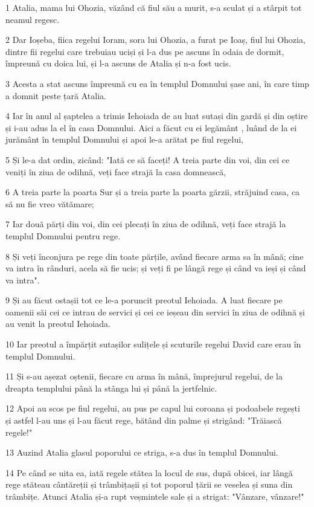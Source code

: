 \par 1 Atalia, mama lui Ohozia, văzând că fiul său a murit, s-a sculat și a stârpit tot neamul regesc.
\par 2 Dar Ioșeba, fiica regelui Ioram, sora lui Ohozia, a furat pe Ioaș, fiul lui Ohozia, dintre fii regelui care trebuiau uciși și l-a dus pe ascuns în odaia de dormit, împreună cu doica lui, și l-a ascuns de Atalia și n-a fost ucis.
\par 3 Acesta a stat ascuns împreună cu ea în templul Domnului șase ani, în care timp a domnit peste țară Atalia.
\par 4 Iar în anul al șaptelea a trimis Iehoiada de au luat sutași din gardă și din oștire și i-au adus la el în casa Domnului. Aici a făcut cu ei legământ , luând de la ei jurământ în templul Domnului și apoi le-a arătat pe fiul regelui,
\par 5 Și le-a dat ordin, zicând: "Iată ce să faceți! A treia parte din voi, din cei ce veniți în ziua de odihnă, veți face strajă la casa domnească,
\par 6 A treia parte la poarta Sur și a treia parte la poarta gărzii, străjuind casa, ca să nu fie vreo vătămare;
\par 7 Iar două părți din voi, din cei plecați în ziua de odihnă, veți face strajă la templul Domnului pentru rege.
\par 8 Și veți înconjura pe rege din toate părțile, având fiecare arma sa în mână; cine va intra în rânduri, acela să fie ucis; și veți fi pe lângă rege și când va ieși și când va intra".
\par 9 Și au făcut ostașii tot ce le-a poruncit preotul Iehoiada. A luat fiecare pe oamenii săi cei ce intrau de servici și cei ce ieșeau din servici în ziua de odihnă și au venit la preotul Iehoiada.
\par 10 Iar preotul a împărțit sutașilor sulițele și scuturile regelui David care erau în templul Domnului.
\par 11 Și s-au așezat oștenii, fiecare cu arma în mână, împrejurul regelui, de la dreapta templului până la stânga lui și până la jertfelnic.
\par 12 Apoi au scos pe fiul regelui, au pus pe capul lui coroana și podoabele regești  și astfel l-au uns și l-au făcut rege, bătând din palme și strigând: "Trăiască regele!"
\par 13 Auzind Atalia glasul poporului ce striga, s-a dus în templul Domnului.
\par 14 Pe când se uita ea, iată regele stătea la locul de sus, după obicei, iar lângă rege stăteau cântăreții și trâmbițașii și tot poporul țării se veselea și suna din trâmbițe. Atunci Atalia și-a rupt veșmintele sale și a strigat: "Vânzare, vânzare!"
